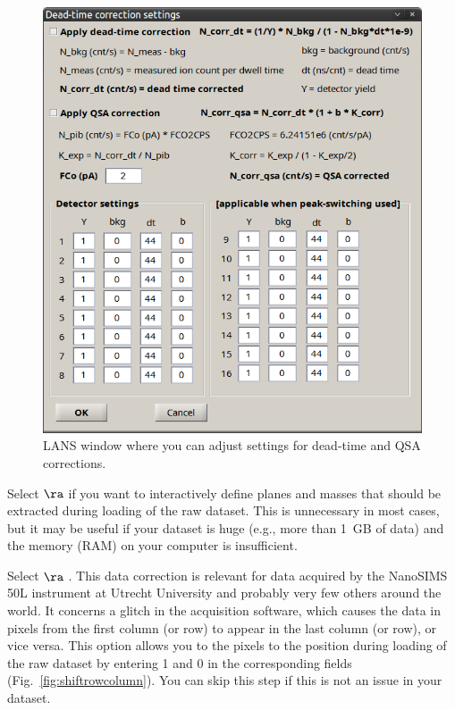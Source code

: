 \begin{figure}[!h]
\centering
\includegraphics[scale=0.4]{figs1/LANS-dt-qsa-settings}
\caption{\label{fig:dtqsa}%
LANS window where you can adjust settings for dead-time and QSA corrections.}
\end{figure}

\s Select  $\ra$  if you want to interactively define  planes and masses that should be extracted during loading of the raw dataset. This is unnecessary in most cases, but it may be useful if your dataset is huge (e.g., more than 1~GB of data) and the memory (RAM) on your computer is insufficient.

\s Select  $\ra$ . This data correction is relevant for data acquired by the NanoSIMS 50L instrument at Utrecht University and probably very few others around the world. It concerns a glitch in the acquisition software, which causes the data in pixels from the first column (or row) to appear in the last column (or row), or vice versa. This option allows you to  the pixels to the  position during loading of the raw dataset by entering 1 and 0 in the corresponding fields (Fig.~\ref{fig:shiftrowcolumn}). You can skip this step if this is not an issue in your dataset.

